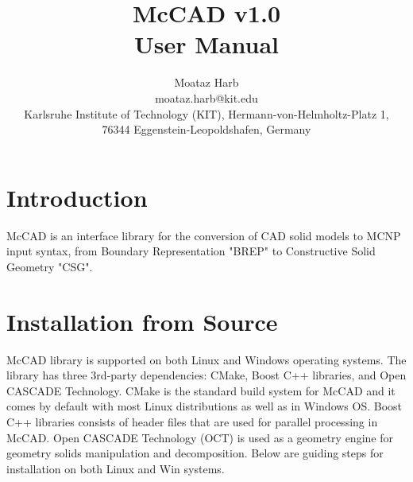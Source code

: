 \documentclass[letterpaper, 10 pt]{report}
\begin{document}
\title{McCAD v1.0 \\ User Manual}
\author{Moataz Harb \\ moataz.harb@kit.edu \\ Karlsruhe Institute of Technology (KIT), Hermann-von-Helmholtz-Platz 1, \\ 76344 Eggenstein-Leopoldshafen, Germany}
\maketitle
\pagestyle{empty}

\tableofcontents
\newpage

\section{Introduction}
McCAD is an interface library for the conversion of CAD solid models to MCNP input syntax, from Boundary Representation "BREP" to Constructive Solid Geometry "CSG".

\section{Installation from Source}
McCAD library is supported on both Linux and Windows operating systems. The library has three 3rd-party dependencies: CMake, Boost C++ libraries, and Open CASCADE Technology. CMake is the standard build system for McCAD and it comes by default with most Linux distributions as well as in Windows OS. Boost C++ libraries consists of header files that are used for parallel processing in McCAD. Open CASCADE Technology (OCT) is used as a geometry engine for geometry solids manipulation and decomposition. Below are guiding steps for installation on both Linux and Win systems. 
\end{document}
